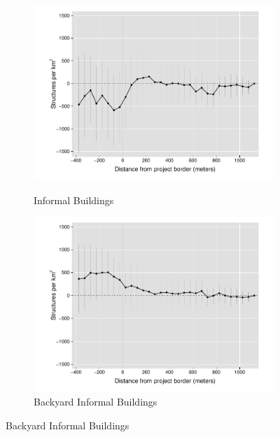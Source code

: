 \documentclass[12pt]{article}
\begin{document}
\begin{figure}[t!]
\begin{subfigure}[b]{0.49\textwidth}
            \label{fig:DDDformal}
        \end{subfigure}
        \vskip -1mm \vskip 0pt
        \begin{subfigure}[b]{0.49\textwidth}
            \centering
            \caption[]{Informal Buildings}
            \vspace{-2mm}
            \includegraphics[width=\textwidth,trim={1cm .8cm .3cm 0cm}, clip=true]{figures/distplotDDD_bblu_inf_admin.pdf}
            \label{fig:DDDinformal}
        \end{subfigure}
        \hfill
        \begin{subfigure}[b]{0.49\textwidth}  
            \centering
            \caption[]{Backyard Informal Buildings}  
            \vspace{-2mm}
            \includegraphics[width=\textwidth,trim={1cm .8cm .3cm 0cm}, clip=true]{figures/distplotDDD_bblu_inf_backyard_admin}

\end{subfigure}
\end{figure}
\end{document}
